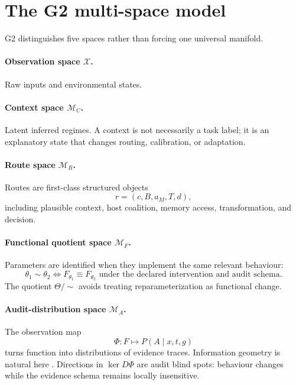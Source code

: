 \documentclass[11pt,a4paper]{article}
\newcommand{\M}{\mathcal{M}}
\begin{document}
\section{The G2 multi-space model}
G2 distinguishes five spaces rather than forcing one universal manifold.

\paragraph{Observation space $\mathcal{X}$.} Raw inputs and environmental states.

\paragraph{Context space $\M_C$.} Latent inferred regimes. A context is not necessarily a task label; it is an explanatory state that changes routing, calibration, or adaptation.

\paragraph{Route space $\M_R$.} Routes are first-class structured objects
\begin{equation}
r=(c,B,a_M,T,d),
\end{equation}
including plausible context, host coalition, memory access, transformation, and decision.

\paragraph{Functional quotient space $\M_F$.} Parameters are identified when they implement the same relevant behaviour:
\begin{equation}
\theta_1\sim\theta_2 \iff F_{\theta_1}\equiv F_{\theta_2}\text{ under the declared intervention and audit schema}.
\end{equation}
The quotient $\Theta/\!\sim$ avoids treating reparameterization as functional change.

\paragraph{Audit-distribution space $\M_A$.} The observation map
\begin{equation}
\Phi:F\mapsto P(A\mid x,t,g)
\end{equation}
turns function into distributions of evidence traces. Information geometry is natural here \cite{amari2016information,fisher1925theory}. Directions in $\ker D\Phi$ are audit blind spots: behaviour changes while the evidence schema remains locally insensitive.
\end{document}

